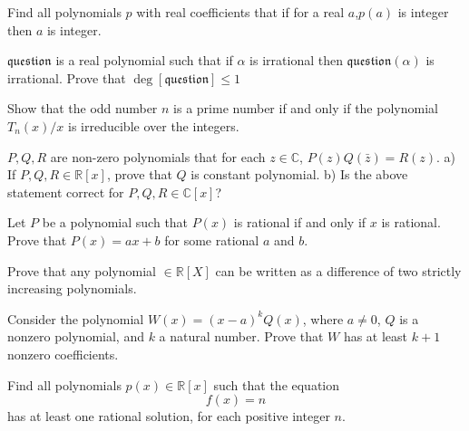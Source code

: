 \begin{question}
Find all polynomials $p$ with real coefficients that if for a real $a$,$p(a)$ is integer then $a$ is integer.
\end{question}



\begin{question}
$\mathfrak {question}$ is a real polynomial such that if $\alpha$ is irrational then $\mathfrak {question} (\alpha)$ is irrational. Prove that $\deg [\mathfrak{question}]\leq 1$
\end{question}



\begin{question}
Show that the odd number $n$ is a prime number if and only if the polynomial $ T_n(x)/x$ is irreducible over the integers.
\end{question}



\begin{question}
$P,Q,R$ are non-zero polynomials that for each $z\in\mathbb C$, $P(z)Q(\bar z)=R(z)$.
a) If $P,Q,R\in\mathbb R[x]$, prove that $Q$ is constant polynomial.
b) Is the above statement correct for $P,Q,R\in\mathbb C[x]$?
\end{question}



\begin{question}
Let $P$ be a polynomial such that $P(x)$ is rational if and only if $x$ is rational. Prove that $P(x)=ax+b$ for some rational $a$ and $b$.
\end{question}



\begin{question}
Prove that any polynomial $\in \mathbb{R} [X]$ can be written as a difference of two strictly increasing polynomials.
\end{question}



\begin{question}
Consider the polynomial $W(x) = (x - a)^kQ(x)$, where $a \neq 0$, $Q$ is a nonzero polynomial, and $k$ a natural number. Prove that $W$ has at least $k + 1$ nonzero coefficients.
\end{question}



\begin{question}
Find all polynomials $p(x) \in \mathbb{R}[x]$ such that the equation \[f(x) = n\] has at least one rational solution, for each positive integer $n$.
\end{question}



